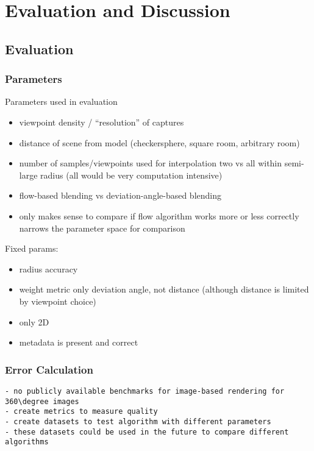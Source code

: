 \chapter{Evaluation and Discussion} \label{chap:evaluation}

\section{Evaluation}
\subsection{Parameters}
Parameters used in evaluation
\begin{itemize}
  \item viewpoint density / ``resolution'' of captures
  \item distance of scene from model (checkersphere, square room, arbitrary room)
  \item number of samples/viewpoints used for interpolation \ar two vs all within semi-large radius (all would be very computation intensive)
  \item flow-based blending vs deviation-angle-based blending
  \item only makes sense to compare if flow algorithm works more or less correctly \ar narrows the parameter space for comparison
\end{itemize}

Fixed params:
\begin{itemize}
  \item radius accuracy
  \item weight metric only deviation angle, not distance (although distance is limited by viewpoint choice)
  \item only 2D
  \item metadata is present and correct
\end{itemize}

\subsection{Error Calculation}

\begin{verbatim}
- no publicly available benchmarks for image-based rendering for 360\degree images
- create metrics to measure quality
- create datasets to test algorithm with different parameters
- these datasets could be used in the future to compare different algorithms
\end{verbatim}

